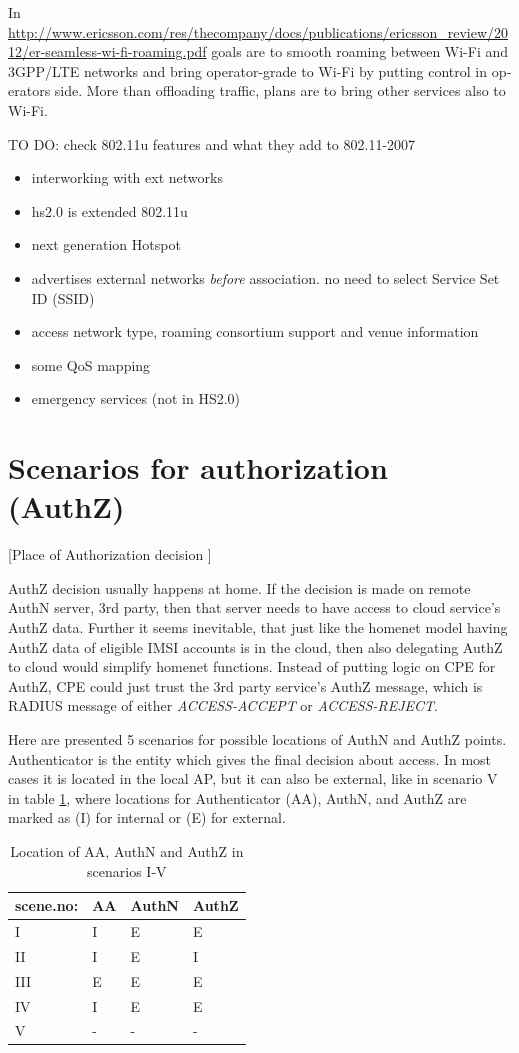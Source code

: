 \documentclass[12pt,a4paper,english]{tutthesis}
\begin{document}
\begin{otherlanguage}{english}
In 
\url{http://www.ericsson.com/res/thecompany/docs/publications/ericsson_review/2012/er-seamless-wi-fi-roaming.pdf}
goals are to smooth roaming between Wi-Fi and 3GPP/LTE networks
and bring operator-grade to Wi-Fi by putting control in operators side. More
than offloading traffic, plans are to bring other services also to Wi-Fi.

TO DO: check 802.11u features and what they add to 802.11-2007
\begin{itemize}
\item interworking with ext networks
\item hs2.0 is extended 802.11u
\item next generation Hotspot
\item advertises external networks \emph{before} association. no need to
select Service Set ID (SSID)
\item access network type, roaming consortium support and venue information
\item some QoS mapping
\item emergency services (not in HS2.0)
\end{itemize}


\section{Scenarios for authorization (AuthZ)}
\label{sec-4-5}

[Place of Authorization decision  ]

AuthZ decision usually happens at home.
If the decision is made on remote AuthN server, 3rd party, 
then that server needs to have access to 
cloud service's AuthZ data. 
Further it seems inevitable, that just like the homenet model
having AuthZ data of eligible IMSI accounts is in the cloud, 
then also delegating AuthZ to cloud would simplify homenet
functions. Instead of putting logic on CPE for AuthZ, CPE
could just trust the 3rd party service's AuthZ message, which is 
RADIUS message of either \emph{ACCESS-ACCEPT} or \emph{ACCESS-REJECT}.


Here are presented 5 scenarios for possible locations of AuthN and 
AuthZ points. Authenticator is the entity which gives the final decision 
about access. In most cases it is located in the
local AP, but it can also be external, like in scenario V in 
table \ref{table-scenarios}, where locations for Authenticator (AA),
AuthN, and AuthZ are marked as (I) for internal or (E) for external.

\begin{table}[htb]
\caption{\label{table-scenarios}Location of AA, AuthN and AuthZ in scenarios I-V}
\centering
\begin{tabular}{llll}
scene.no: & AA & AuthN & AuthZ\\
\hline
I & I & E & E\\
II & I & E & I\\
III & E & E & E\\
IV & I & E & E\footnotemark\\
V & - & - & -\\
\end{tabular}
\end{table}


\end{otherlanguage}
\end{document}
